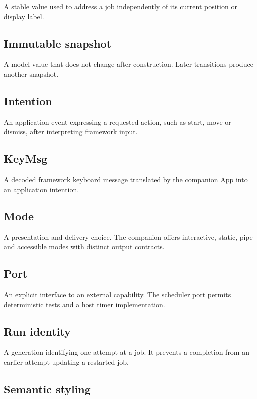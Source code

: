 A stable value used to address a job independently of its current position or display label.

\subsection{Immutable snapshot}

A model value that does not change after construction. Later transitions produce another snapshot.

\subsection{Intention}

An application event expressing a requested action, such as start, move or dismiss, after interpreting framework input.

\subsection{KeyMsg}

A decoded framework keyboard message translated by the companion App into an application intention.

\subsection{Mode}

A presentation and delivery choice. The companion offers interactive, static, pipe and accessible modes with distinct output contracts.

\subsection{Port}

An explicit interface to an external capability. The scheduler port permits deterministic tests and a host timer implementation.

\subsection{Run identity}

A generation identifying one attempt at a job. It prevents a completion from an earlier attempt updating a restarted job.

\subsection{Semantic styling}

